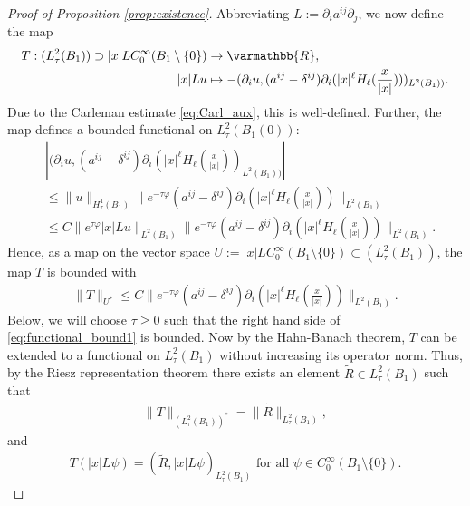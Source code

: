 \documentclass[12pt,twoside]{amsart}
\numberwithin{equation}{section}
\renewcommand{\leq}{\leqslant}
\renewcommand{\geq}{\geqslant}
\renewcommand{\mathbb}{\varmathbb}
\newcommand {\R} {\mathbb{R}} \newcommand {\Z} {\mathbb{Z}}
\newcommand {\p} {\partial}
\begin{document}
\begin{appendix}
\begin{proof}[Proof of Proposition \ref{prop:existence}]
Abbreviating $L:= \p_i a^{ij} \p_j$, we now define the map
\begin{align*}
T:(L^2_{\tau}(B_{1})) \supset |x| L C_0^{\infty}(B_{1}\setminus \{0\}) & \rightarrow \R, \\ 
|x| L u &\mapsto -(\p_i u, (a^{ij}-\delta^{ij})\p_i (|x|^{\ell}H_{\ell}(\frac{x}{|x|})))_{L^2(B_{1}))}.
\end{align*}
Due to the Carleman estimate \eqref{eq:Carl_aux}, this is well-defined. Further, the map defines a bounded functional on $L^2_{\tau}(B_1(0))$:
\begin{align*}
&|(\p_i u, (a^{ij}-\delta^{ij}) \p_i (|x|^{\ell}H_{\ell}(\frac{x}{|x|}))_{L^2(B_{1}))}| \\
&\leq 
\|u\|_{H^1_{\tau}(B_{1})} \|e^{-\tau \varphi} (a^{ij}-\delta^{ij}) \p_i (|x|^{\ell}H_{\ell}(\frac{x}{|x|}))\|_{L^2(B_{1})}\\
&\leq C \|e^{\tau \varphi} |x|  L u\|_{L^2(B_1)} \|e^{-\tau \varphi} (a^{ij}-\delta^{ij}) \p_i (|x|^{\ell}H_{\ell}(\frac{x}{|x|}))\|_{L^2(B_{1})}.
\end{align*}
Hence, as a map on the vector space $U:=|x| L C_0^{\infty}(B_{1}\setminus \{0\}) \subset (L^2_{\tau}(B_1))$, the map $T$ is bounded with 
\begin{align}
\label{eq:functional_bound1}
\|T\|_{U^{\ast}} \leq C \| e^{- \tau \varphi} (a^{ij}-\delta^{ij}) \p_i (|x|^{\ell}H_{\ell}(\frac{x}{|x|})) \|_{L^2(B_{1})}.
\end{align}
Below, we will choose $\tau \geq 0$ such that the right hand side of \eqref{eq:functional_bound1} is bounded.
Now by the Hahn-Banach theorem, $T$ can be extended to a functional on $L^2_{\tau}(B_1)$ without increasing its operator norm. Thus, by the Riesz representation theorem there exists an element $\tilde{R} \in  L^2_{\tau}(B_{1})$ such that 
\begin{align*}
\|T\|_{(L^2_{\tau}(B_{1}))^{\ast }} = \|\tilde{R}\|_{L^2_{\tau}(B_{1})} ,
\end{align*}
and
\begin{align*}
T(|x|L\psi) = (\tilde{R}, |x| L\psi)_{L^2_{\tau}(B_1)} \mbox{ for all }  \psi \in C_0^{\infty}(B_1\setminus \{0\}).
\end{align*}


\end{proof}
\end{appendix}
\end{document}

